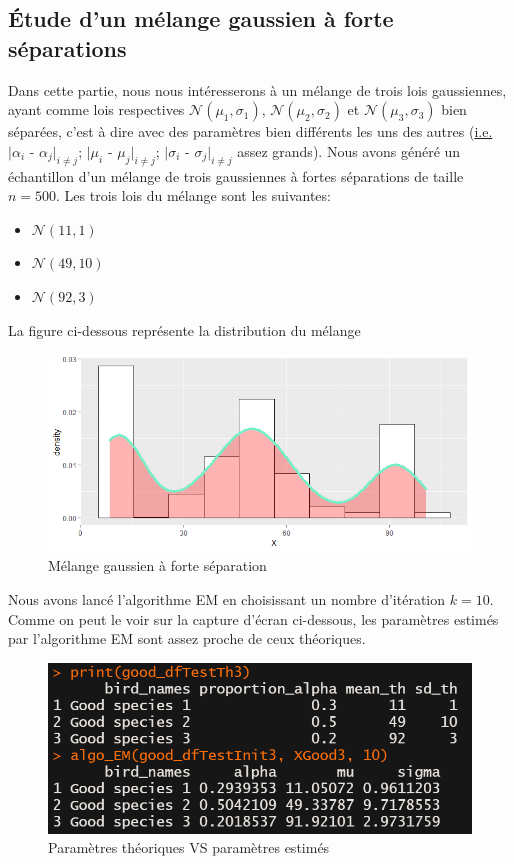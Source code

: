 \documentclass[frenchb]{report}
\newcommand{\1}{\mathbbm{1}}
\theoremstyle{definition}\newtheorem{defn}{Définition}
\theoremstyle{definition}\newtheorem{exm}{Exemple}
\theoremstyle{definition}\newtheorem{nota}{Notation}
\theoremstyle{definition}\newtheorem{rem}{Remarque}
\begin{document}
\subsection{Étude d'un mélange gaussien à forte séparations}
Dans cette partie, nous nous intéresserons à un mélange de trois lois gaussiennes, ayant comme lois respectives $\mathcal{N}(\mu_1, \sigma_1)$, $\mathcal{N}(\mu_2, \sigma_2)$ et $\mathcal{N}(\mu_3, \sigma_3)$ bien séparées, c'est à dire avec des paramètres bien différents les uns des autres (\underline{i.e. }$|\alpha_i$ - $\alpha_j|_{i \neq j}$; $|\mu_i$ - $\mu_j|_{i \neq j}$; $|\sigma_i$ - $\sigma_j|_{i \neq j}$ assez grands). Nous avons généré un échantillon d'un mélange de trois gaussiennes à fortes séparations de taille $n = 500$. Les trois lois du mélange sont les suivantes:
\begin{itemize}
	\item $\mathcal{N}(11, 1)$
	\item $\mathcal{N}(49, 10)$
	\item $\mathcal{N}(92, 3)$
\end{itemize}
La figure ci-dessous représente la distribution du mélange
\begin{figure}[H]
	\centering
	\includegraphics[scale=0.7]{images/good_distrib.png}
	\caption{Mélange gaussien à forte séparation}
\end{figure}
Nous avons lancé l'algorithme EM en choisissant un nombre d'itération $k = 10$. Comme on peut le voir sur la capture d'écran ci-dessous, les paramètres estimés par l'algorithme EM sont assez proche de ceux théoriques.
\begin{figure}[H]
	\centering
	\includegraphics[scale=0.7]{images/EM_good.png}
	\caption{Paramètres théoriques VS paramètres estimés}
\end{figure}
\end{document}
